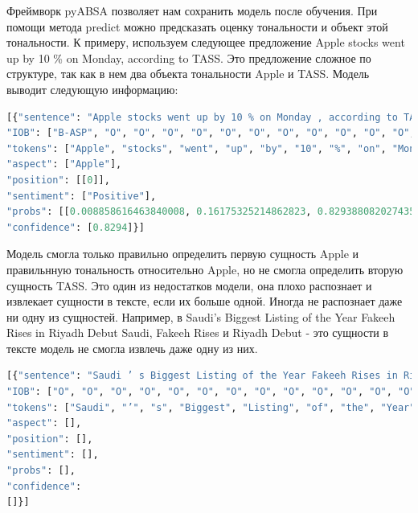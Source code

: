 Фреймворк pyABSA позволяет нам сохранить модель после обучения. При помощи метода predict можно предсказать оценку тональности и объект этой тональности. К примеру, используем следующее предложение \flqq Apple stocks went up by 10 \% on Monday, according to TASS\frqq. Это предложение сложное по структуре, так как в нем два объекта тональности Apple и TASS. Модель выводит следующую информацию:

\begin{lstlisting}[label=listing8, caption=Predication, language = Python]
[{"sentence": "Apple stocks went up by 10 % on Monday , according to TASS .", 
"IOB": ["B-ASP", "O", "O", "O", "O", "O", "O", "O", "O", "O", "O", "O", "O", "O"], 
"tokens": ["Apple", "stocks", "went", "up", "by", "10", "%", "on", "Monday", ",", "according", "to", "TASS", "."], 
"aspect": ["Apple"], 
"position": [[0]], 
"sentiment": ["Positive"], 
"probs": [[0.008858616463840008, 0.16175325214862823, 0.8293880820274353]], 
"confidence": [0.8294]}]
\end{lstlisting}

Модель смогла только правильно определить первую сущность Apple  и правильнную тональность относительно Apple, но не смогла определить вторую сущность TASS. Это один из недостатков модели, она плохо распознает и извлекает сущности в тексте, если их больше одной. Иногда не распознает даже ни одну из сущностей. Например, в  \flqq Saudi’s Biggest Listing of the Year Fakeeh Rises in Riyadh Debut\frqq \vspace{1pt} Saudi, Fakeeh Rises и Riyadh Debut - это сущности в тексте модель не смогла извлечь даже одну из них.
\begin{lstlisting}[label=listing8, caption=No Predication, language = Python]
[{"sentence": "Saudi ’ s Biggest Listing of the Year Fakeeh Rises in Riyadh Debut", 
"IOB": ["O", "O", "O", "O", "O", "O", "O", "O", "O", "O", "O", "O", "O"], 
"tokens": ["Saudi", "’", "s", "Biggest", "Listing", "of", "the", "Year", "Fakeeh", "Rises", "in", "Riyadh", "Debut"], 
"aspect": [], 
"position": [], 
"sentiment": [], 
"probs": [], 
"confidence": 
[]}]
\end{lstlisting}

